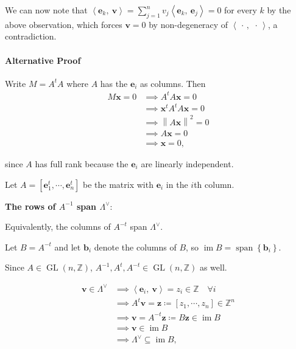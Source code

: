 \begin{solution}
We can now note that
\({\left\langle {\mathbf{e}_k},~{\mathbf{v}} \right\rangle} = \sum_{j=1}^n v_j {\left\langle {\mathbf{e}_k},~{\mathbf{e}_j} \right\rangle} = 0\)
for every \(k\) by the above observation, which forces
\(\mathbf{v} = 0\) by non-degeneracy of
\({\left\langle {{\,\cdot\,}},~{{\,\cdot\,}} \right\rangle}\), a
contradiction.

\hypertarget{alternative-proof}{%
\paragraph{Alternative Proof}\label{alternative-proof}}

Write \(M = A^tA\) where \(A\) has the \(\mathbf{e}_i\) as columns. Then
\begin{align*}
M\mathbf{x} = 0 
&\implies A^t A \mathbf{x} = 0 \\
&\implies \mathbf{x}^t A^t A \mathbf{x} = 0 \\
&\implies {\left\lVert {A \mathbf{x}} \right\rVert}^2  = 0 \\
&\implies A\mathbf{x} = 0 \\
&\implies \mathbf{x} = 0
,\end{align*}

since \(A\) has full rank because the \(\mathbf{e}_i\) are linearly
independent.

Let \(A = [\mathbf{e}_1^t, \cdots, \mathbf{e}_n^t]\) be the matrix with
\(\mathbf{e}_i\) in the \(i\)th column.

\textbf{The rows of \(A^{-1}\) span \(\Lambda^\vee\)}:

Equivalently, the columns of \(A^{-t}\) span \(\Lambda^\vee\).

Let \(B = A^{-t}\) and let \(\mathbf{b}_i\) denote the columns of \(B\),
so
\(\operatorname{im}B = {\operatorname{span}}{\left\{{\mathbf{b}_i}\right\}}\).

Since \(A \in \operatorname{GL}(n, {\mathbb{Z}})\),
\(A^{-1}, A^t, A^{-t} \in \operatorname{GL}(n, {\mathbb{Z}})\) as well.

\begin{align*}
\mathbf{v} \in \Lambda^\vee
&\implies {\left\langle {\mathbf{e}_i},~{\mathbf{v}} \right\rangle} = z_i \in {\mathbb{Z}}\quad \forall i \\
&\implies A^t \mathbf{v} = \mathbf{z} \coloneqq[z_1, \cdots, z_n] \in {\mathbb{Z}}^n \\
&\implies \mathbf{v} = A^{-t} \mathbf{z} \coloneqq B\mathbf{z} \in \operatorname{im}B \\
&\implies \mathbf{v} \in \operatorname{im}B \\
&\implies \Lambda^\vee\subseteq \operatorname{im}B
,\end{align*}


\end{solution}
